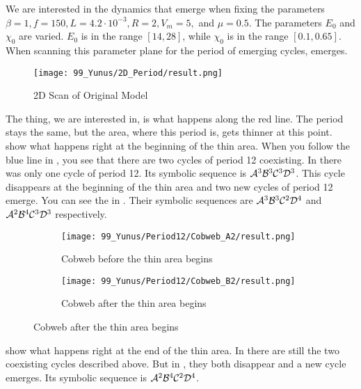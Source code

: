 We are interested in the dynamics that emerge when fixing the parameters $\beta = 1, f = 150, L = 4.2 \cdot 10^{-3}, R = 2, V_m = 5,$ and $\mu = 0.5$.
The parameters $E_0$ and $\chi_0$ are varied.
$E_0$ is in the range $[14, 28]$, while $\chi_0$ is in the range $[0.1, 0.65]$.
When scanning this parameter plane for the period of emerging cycles,  emerges.

\begin{figure}
    \centering
    \texttt{[image: 99\_Yunus/2D\_Period/result.png]}
    \caption{2D Scan of Original Model}
    \label{fig:yunus.2pi.2d.full}
\end{figure}

The thing, we are interested in, is what happens along the red line.
The period stays the same, but the area, where this period is, gets thinner at this point.
 show what happens right at the beginning of the thin area.
When you follow the blue line in , you see that there are two cycles of period 12 coexisting.
In  there was only one cycle of period 12.
Its symbolic sequence is $\mathcal{A}^3\mathcal{B}^3\mathcal{C}^3\mathcal{D}^3$.
This cycle disappears at the beginning of the thin area and two new cycles of period 12 emerge.
You can see the in .
Their symbolic sequences are $\mathcal{A}^3\mathcal{B}^3\mathcal{C}^2\mathcal{D}^4$ and $\mathcal{A}^2\mathcal{B}^4\mathcal{C}^3\mathcal{D}^3$ respectively.

\begin{figure}
    \centering
    \begin{subfigure}{0.4\textwidth}
        \centering
        \texttt{[image: 99\_Yunus/Period12/Cobweb\_A2/result.png]}
        \caption{Cobweb before the thin area begins}
        \label{fig:yunus.2pi.CobwebA2}
    \end{subfigure}
    \begin{subfigure}{0.4\textwidth}
        \centering
        \texttt{[image: 99\_Yunus/Period12/Cobweb\_B2/result.png]}
        \caption{Cobweb after the thin area begins}
        \label{fig:yunus.2pi.CobwebB2}
    \end{subfigure}
\end{figure}

 show what happens right at the end of the thin area.
In  there are still the two coexisting cycles described above.
But in , they both disappear and a new cycle emerges.
Its symbolic sequence is $\mathcal{A}^2\mathcal{B}^4\mathcal{C}^2\mathcal{D}^4$.

